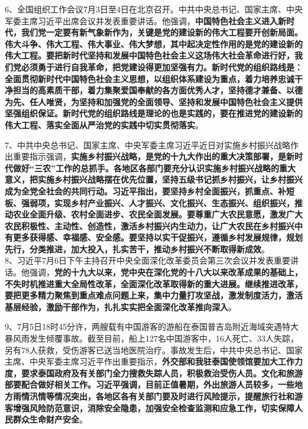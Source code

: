 6、全国组织工作会议7月3日至4日在北京召开。中共中央总书记、国家主席、中央军委主席习近平出席会议并发表重要讲话。他强调，{\textbf{中国特色社会主义进入新时代，我们党一定要有新气象新作为，关键是党的建设新的伟大工程要开创新局面。伟大斗争、伟大工程、伟大事业、伟大梦想，其中起决定性作用的是党的建设新的伟大工程。要把新时代坚持和发展中国特色社会主义这场伟大社会革命进行好，我们党必须勇于进行自我革命，把党建设得更加坚强有力。新时代党的组织路线是：全面贯彻新时代中国特色社会主义思想，以组织体系建设为重点，着力培养忠诚干净担当的高素质干部，着力集聚爱国奉献的各方面优秀人才，坚持德才兼备、以德为先、任人唯贤，为坚持和加强党的全面领导、坚持和发展中国特色社会主义提供坚强组织保证。新时代党的组织路线是理论的也是实践的，要在推进党的建设新的伟大工程、落实全面从严治党的实践中切实贯彻落实}}。

7、中共中央总书记、国家主席、中央军委主席习近平近日对实施乡村振兴战略作出重要指示强调，{\textbf{实施乡村振兴战略，是党的十九大作出的重大决策部署，是新时代做好``三农''工作的总抓手。各地区各部门要充分认识实施乡村振兴战略的重大意义，把实施乡村振兴战略摆在优先位置，坚持五级书记抓乡村振兴，让乡村振兴成为全党全社会的共同行动。习近平指出，要坚持乡村全面振兴，抓重点、补短板、强弱项，实现乡村产业振兴、人才振兴、文化振兴、生态振兴、组织振兴，推动农业全面升级、农村全面进步、农民全面发展。要尊重广大农民意愿，激发广大农民积极性、主动性、创造性，激活乡村振兴内生动力，让广大农民在乡村振兴中有更多获得感、幸福感、安全感。要坚持以实干促振兴，遵循乡村发展规律，规划先行，分类推进，加大投入，扎实苦干，推动乡村振兴不断取得新成效}}。\\

8、习近平7月6日下午主持召开中央全面深化改革委员会第三次会议并发表重要讲话。他强调，{\textbf{党的十九大以来，党中央在深化党的十八大以来改革成果的基础上，不失时机推进重大全局性改革，全面深化改革取得新的重大进展。继续推进改革，要把更多精力聚焦到重点难点问题上来，集中力量打攻坚战，激发制度活力，激活基层经验，激励干部作为，扎扎实实把全面深化改革推向深入}}。

9、7月5日18时45分许，两艘载有中国游客的游船在泰国普吉岛附近海域突遇特大暴风雨发生倾覆事故。截至目前，船上127名中国游客中，16人死亡、33人失踪，另有78人获救，受伤游客已送当地医院治疗。事故发生后，中共中央总书记、国家主席、中央军委主席习近平作出重要指示，{\textbf{外交部和我驻泰国使领馆要加大工作力度，要求泰国政府及有关部门全力搜救失踪人员，积极救治受伤人员。文化和旅游部要配合做好相关工作。习近平强调，目前正值暑期，外出旅游人员较多，一些地方雨情汛情等情况突出，各地区各有关部门要及时进行风险提示，提醒旅行社和游客增强风险防范意识，消除安全隐患，加强安全检查监测和应急工作，切实保障人民群众生命财产安全}}。


